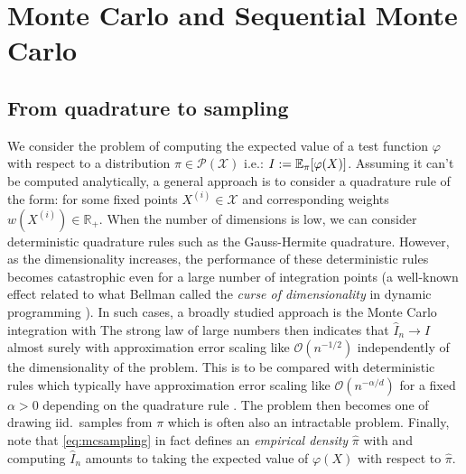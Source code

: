 
\section{Monte Carlo and Sequential Monte Carlo}
\subsection{From quadrature to sampling}
We consider the problem of computing the expected value of a test function $\varphi$ with respect to a distribution $\pi\in\mathcal P(\mathcal X)$ i.e.: $I:=\mathbb E_\pi[\varphi(X)]$. Assuming it can't be computed analytically, a general approach is to consider a quadrature rule of the form:
%
%
for some fixed points $X^{(i)}\in\mathcal X$ and corresponding weights $w(X^{(i)})\in\mathbb R_+$. 
When the number of dimensions is low, we can consider deterministic quadrature rules such as the Gauss-Hermite quadrature.\addref 
However, as the dimensionality increases, the performance of these deterministic rules becomes catastrophic even for a large number of integration points (a well-known effect related to what Bellman called the \emph{curse of dimensionality} in dynamic programming \citep{bellman57}). 
In such cases, a broadly studied approach is the Monte Carlo integration with
%
%
The strong law of large numbers then indicates that $\widehat I_n\to I$ almost surely with approximation error scaling like $\mathcal O(n^{-1/2})$ independently of the dimensionality of the problem. This is to be compared with deterministic rules which typically have approximation error scaling like $\mathcal O(n^{-\alpha/d})$ for a fixed $\alpha>0$ depending on the quadrature rule \citep{caflisch98}. The problem then becomes one of drawing iid.\ samples from $\pi$ which is often also an intractable problem. Finally, note that \eqref{eq:mcsampling} in fact defines an \emph{empirical density} $\hat \pi$ with
%
%
and computing $\hat I_{n}$ amounts to taking the expected value of $\varphi(X)$ with respect to $\hat\pi$.

